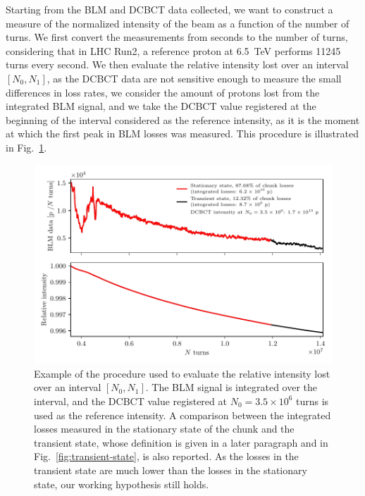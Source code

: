 Starting from the BLM and DCBCT data collected, we want to construct a measure of the normalized intensity of the beam as a function of the number of turns. We first convert the measurements from seconds to the number of turns, considering that in LHC Run2, a reference proton at \SI{6.5}{TeV} performs 11245 turns every second. We then evaluate the relative intensity lost over an interval $[N_0, N_1]$, as the DCBCT data are not sensitive enough to measure the small differences in loss rates, we consider the amount of protons lost from the integrated BLM signal, and we take the DCBCT value registered at the beginning of the interval considered as the reference intensity, as it is the moment at which the first peak in BLM losses was measured. This procedure is illustrated in Fig.~\ref{fig:blm-to-intensity}.

\begin{figure}[hpt]
    \centering
    \includegraphics[width=1.0\textwidth]{5_wire_compensators_LHC/figs/stationary_transient_example_chunk.pdf}
    \caption{Example of the procedure used to evaluate the relative intensity lost over an interval $[N_0, N_1]$. The BLM signal is integrated over the interval, and the DCBCT value registered at $N_0=3.5\times10^6$ turns is used as the reference intensity. A comparison between the integrated losses measured in the stationary state of the chunk and the transient state, whose definition is given in a later paragraph and in Fig.~\ref{fig:transient-state}, is also reported. As the losses in the transient state are much lower than the losses in the stationary state, our working hypothesis still holds.}
    \label{fig:blm-to-intensity}
\end{figure}

